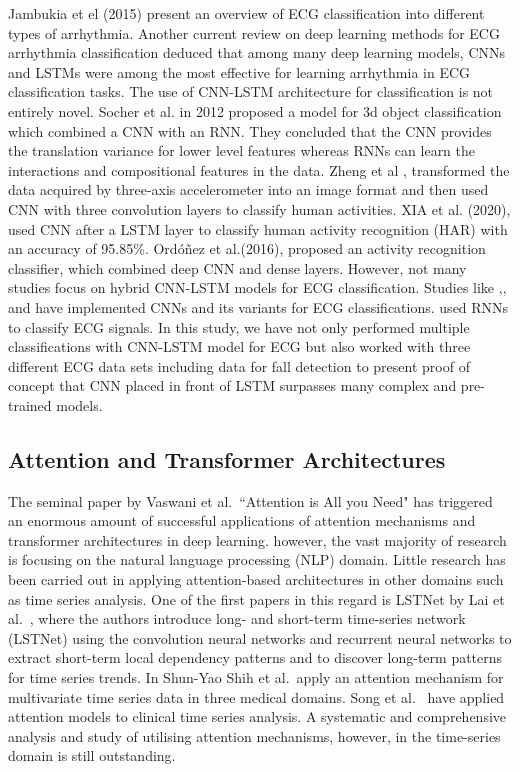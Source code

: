 \documentclass{ieeeaccess}
\begin{document}
Jambukia et el (2015) \cite{7164783} present an overview of ECG classification into different types of arrhythmia. Another current review on deep learning methods for ECG arrhythmia classification \cite{EBRAHIMI2020100033} deduced that among many deep learning models, CNNs and LSTMs were among the most effective for learning arrhythmia in ECG classification tasks.
The use of CNN-LSTM architecture for classification is not entirely novel. Socher et al. \cite{NIPS2012_3eae62bb} in 2012 proposed a model for 3d object classification which combined a CNN with an RNN. They concluded that the CNN provides the translation variance for lower level features whereas RNNs can learn the interactions and compositional features in the data. Zheng et al \cite{zheng}, transformed the data acquired by three-axis accelerometer into an image format and then used CNN with three convolution layers to classify human activities. XIA et al. (2020), \cite{xia}  used CNN after a LSTM layer to classify human activity recognition (HAR) with an accuracy of 95.85\%. Ordóñez et al.(2016),\cite{ordonez} proposed an activity recognition classifier, which combined deep CNN and dense layers. 
However, not many studies focus on hybrid CNN-LSTM models for ECG classification. Studies like \cite{8419425},\cite{2019},\cite{WANG2021106006} and \cite{e23010119} have implemented CNNs and its variants for ECG classifications. \cite{saadat} used RNNs to classify ECG signals. In this study, we have not only performed multiple classifications with CNN-LSTM model for ECG but also worked with three different ECG data sets including data for fall detection to present proof of concept that CNN placed in front of LSTM surpasses many complex and pre-trained models.

\subsection{Attention and Transformer Architectures}
The seminal paper by Vaswani et al.~``Attention is All you Need" \cite{VaswaniEtAl} has triggered an enormous amount of successful applications of attention mechanisms and transformer architectures in deep learning. however, the vast majority of research is focusing on the natural language processing (NLP) domain. Little research has been carried out in applying attention-based architectures in other domains such as time series analysis. One of the first papers in this regard is LSTNet by Lai et al.~\cite{LaiEtAl}, where the authors introduce long- and short-term time-series network (LSTNet) using the convolution neural networks and  recurrent neural networks to extract short-term local dependency patterns and to discover long-term patterns for time series trends. In \cite{ShunYaoEtAl} Shun-Yao Shih et al.\ apply an attention mechanism for multivariate time series data in three medical domains. Song et al.~\cite{SongEtAl} have applied attention models to clinical time series analysis. A systematic and comprehensive analysis and study of utilising attention mechanisms, however, in the time-series domain is still outstanding.
\end{document}
